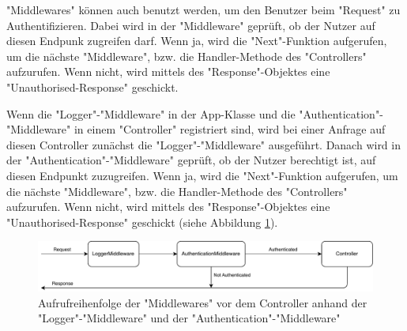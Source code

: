 
"Middlewares" können auch benutzt werden, um den Benutzer beim "Request" zu Authentifizieren. Dabei wird in der "Middleware" geprüft, ob der Nutzer auf diesen Endpunk zugreifen darf. Wenn ja, wird die "Next"-Funktion aufgerufen, um die nächste "Middleware", bzw. die Handler-Methode des "Controllers" aufzurufen. Wenn nicht, wird mittels des "Response"-Objektes eine "Unauthorised-Response" geschickt.

Wenn die "Logger"-"Middleware" in der App-Klasse und die "Authentication"-"Middleware" in einem "Controller" registriert sind, wird bei einer Anfrage auf diesen Controller zunächst die "Logger"-"Middleware" ausgeführt. Danach wird in der "Authentication"-"Middleware" geprüft, ob der Nutzer berechtigt ist, auf diesen Endpunkt zuzugreifen. Wenn ja, wird die "Next"-Funktion aufgerufen, um die nächste "Middleware", bzw. die Handler-Methode des "Controllers" aufzurufen. Wenn nicht, wird mittels des "Response"-Objektes eine "Unauthorised-Response" geschickt (siehe Abbildung \ref{fig:authMiddleware}).

\begin{figure}[H]
    \centering
    \includegraphics[width=15cm]{media/APITemplate/AuthMiddleware.svg.pdf}
    \caption{Aufrufreihenfolge der "Middlewares" vor dem Controller anhand der "Logger"-"Middleware" und der "Authentication"-"Middleware" } 
    \label{fig:authMiddleware}
\end{figure}


